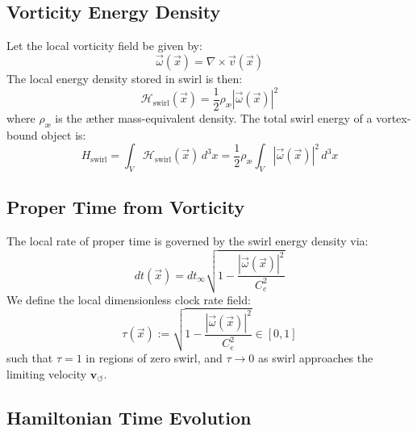 \documentclass[12pt]{article}
\begin{document}
    \subsection{Vorticity Energy Density}

    Let the local vorticity field be given by:
    \begin{equation}
        \vec{\omega}(\vec{x}) = \nabla \times \vec{v}(\vec{x})
    \end{equation}
    The local energy density stored in swirl is then:
    \begin{equation}
        \mathcal{H}_{\text{swirl}}(\vec{x}) = \frac{1}{2} \rho_\text{\ae} |\vec{\omega}(\vec{x})|^2
    \end{equation}
    where \( \rho_\text{\ae} \) is the æther mass-equivalent density. The total swirl energy of a vortex-bound object is:
    \begin{equation}
        H_{\text{swirl}} = \int_V \mathcal{H}_{\text{swirl}}(\vec{x}) \, d^3x = \frac{1}{2} \rho_\text{\ae} \int_V |\vec{\omega}(\vec{x})|^2 \, d^3x
    \end{equation}

    \subsection{Proper Time from Vorticity}

    The local rate of proper time is governed by the swirl energy density via:
    \begin{equation}
        dt(\vec{x}) = dt_\infty \sqrt{1 - \frac{|\vec{\omega}(\vec{x})|^2}{C_e^2}}
    \end{equation}
    We define the local dimensionless clock rate field:
    \begin{equation}
        \tau(\vec{x}) := \sqrt{1 - \frac{|\vec{\omega}(\vec{x})|^2}{C_e^2}} \in [0,1]
    \end{equation}
    such that \( \tau = 1 \) in regions of zero swirl, and \( \tau \to 0 \) as swirl approaches the limiting velocity \( \mathbf{v}_{\scriptscriptstyle\boldsymbol{\circlearrowleft}} \).

    \subsection{Hamiltonian Time Evolution}
\end{document}
